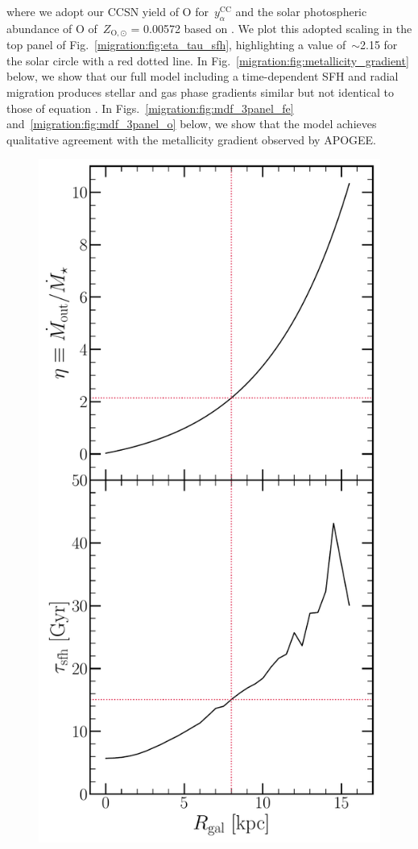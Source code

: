 where we adopt our CCSN yield of O for~$y_\alpha^\text{CC}$ and the solar 
photospheric abundance of O of~$Z_{\text{O},\odot}$ = 0.00572 based on 
\citet{Asplund2009}. 
We plot this adopted scaling in the top panel of Fig.~\ref{migration:fig:eta_tau_sfh}, 
highlighting a value of~$\sim$2.15 for the solar circle with a red dotted line. 
In Fig.~\ref{migration:fig:metallicity_gradient} below, we show that our full model 
including a time-dependent SFH and radial migration produces stellar and gas 
phase gradients similar but not identical to those of equation 
. 
In Figs.~\ref{migration:fig:mdf_3panel_fe} and~\ref{migration:fig:mdf_3panel_o} below, we show that 
the model achieves qualitative agreement with the metallicity gradient observed 
by APOGEE. 

\begin{figure} 
\centering 
\includegraphics[scale = 0.45]{eta_tau_sfh.pdf} 

\end{figure}
